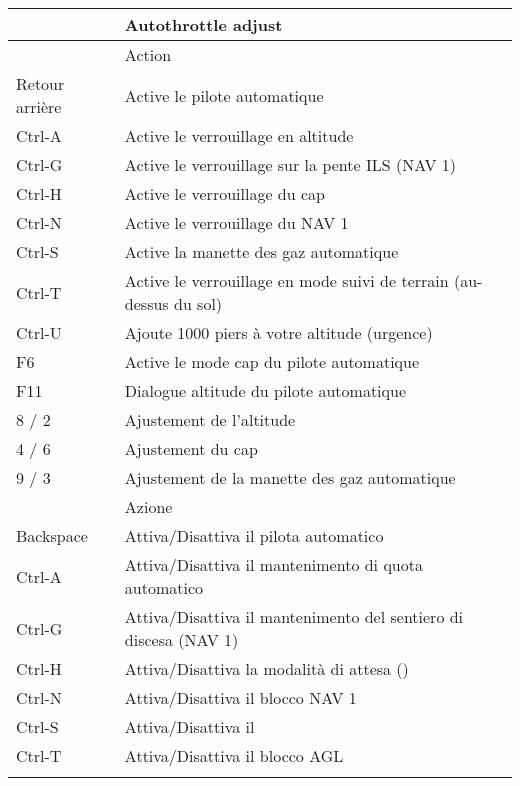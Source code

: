 \begin{tabular}{|l|l|}
{    9 / 3         &         Autothrottle adjust \\\hline
}{}
\fi
\IfLanguageName{french}{
 Touche           &         Action\\\hline
    Retour arri\`{e}re     &         Active le pilote automatique\\
    Ctrl-A        &         Active le verrouillage en altitude \index{maintien d'altitude}\\
    Ctrl-G        &         Active le verrouillage sur la pente ILS (NAV 1)\\
    Ctrl-H        &         Active le verrouillage du cap \index{maintient de cap}\\
    Ctrl-N        &         Active le verrouillage du NAV 1\\
    Ctrl-S        &         Active la manette des gaz automatique\index{manette des gaz automatique}\\
    Ctrl-T        &         Active le verrouillage en mode suivi de terrain (au-dessus du sol)\\
    Ctrl-U        &         Ajoute 1000 piers \`{a} votre altitude (urgence)\\
    F6            &         Active le mode cap du pilote automatique\\
    F11           &         Dialogue altitude du pilote automatique\\\hline
    8 / 2         &         Ajustement de l'altitude\\
    4 / 6         &         Ajustement du cap\\
    9 / 3         &         Ajustement de la manette des gaz automatique \\\hline
}{}
\IfLanguageName{italian}{
Pulsante/i     &  Azione\\\hline
    Backspace     &         Attiva/Disattiva il pilota automatico\\
    Ctrl-A        &         Attiva/Disattiva il mantenimento di quota automatico\\
    Ctrl-G        &         Attiva/Disattiva il mantenimento del sentiero di discesa (NAV 1)\\
    Ctrl-H        &         Attiva/Disattiva la modalit\`{a} di attesa (\index{volo in tondo})\\
    Ctrl-N        &         Attiva/Disattiva il blocco NAV 1\\
    Ctrl-S        &         Attiva/Disattiva il \index{controllo automatico della velocit\`{a}}\\
    Ctrl-T        &         Attiva/Disattiva il blocco AGL\\
}
\end{tabular}

